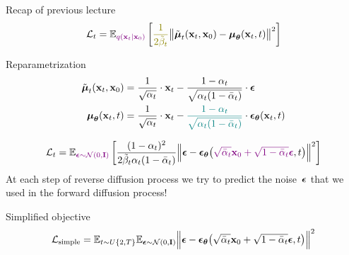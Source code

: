 \begin{frame}{Recap of previous lecture}
	\vspace{-0.3cm}
	\[
		\cL_t = \bbE_{\color{violet}q(\bx_t | \bx_0)} \left[ {\color{olive}\frac{1}{2\tilde{\beta}_t}} \bigl\| \tilde{\bmu}_t(\bx_t, \bx_0) - \bmu_{\btheta}(\bx_t, t) \bigr\|^2  \right]
	\]
	\vspace{-0.3cm}
	\begin{block}{Reparametrization}
		\vspace{-0.7cm}
		\begin{align*}
			\tilde{\boldsymbol{\mu}}_t(\mathbf{x}_t, \mathbf{x}_0) &= \frac{1}{\sqrt{\alpha_t}} \cdot \mathbf{x}_t - \frac{1 - \alpha_t}{\sqrt{\alpha_t (1 - \bar{\alpha}_t)}} \cdot \boldsymbol{\epsilon} \\
			\boldsymbol{\mu}_{\boldsymbol{\theta}}(\mathbf{x}_t, t) &= \frac{1}{\sqrt{\alpha_t}} \cdot \mathbf{x}_t - {\color{teal}\frac{1 - \alpha_t}{\sqrt{\alpha_t (1 - \bar{\alpha}_t)}}} \cdot \boldsymbol{\epsilon}_{\boldsymbol{\theta}}(\mathbf{x}_t, t)
		\end{align*}
		\vspace{-0.7cm}
	\end{block}
	\vspace{-0.2cm}
	\[
		\mathcal{L}_t  =	 \mathbb{E}_{\color{violet}\boldsymbol{\epsilon} \sim \mathcal{N}(0, \mathbf{I})} \left[ \frac{(1 - \alpha_t)^2}{2\tilde{\beta}_t \alpha_t (1 - \bar{\alpha}_t)} \Bigl\| \boldsymbol{\epsilon} - \boldsymbol{\epsilon}_{\boldsymbol{\theta}}\bigl( {\color{violet}\sqrt{\bar{\alpha}_t} \mathbf{x}_0 + \sqrt{1 - \bar{\alpha}_t} \boldsymbol{\epsilon}}, t\bigr) \Bigr\|^2 \right]
	\]
	At each step of reverse diffusion process we try to predict the noise~$\boldsymbol{\epsilon}$ that we used in the forward diffusion process!
	\begin{block}{Simplified objective}
		\vspace{-0.7cm}
		\[
			 \mathcal{L}_{\text{simple}} = \mathbb{E}_{t \sim U\{2, T\}} \mathbb{E}_{\boldsymbol{\epsilon} \sim \mathcal{N}(0, \mathbf{I})} \Bigl\| \boldsymbol{\epsilon} - \boldsymbol{\epsilon}_{\boldsymbol{\theta}}\bigl( \sqrt{\bar{\alpha}_t} \mathbf{x}_0 + \sqrt{1 - \bar{\alpha}_t} \boldsymbol{\epsilon}, t\bigr) \Bigr\|^2 
		\]
	\end{block}
	\end{frame}
